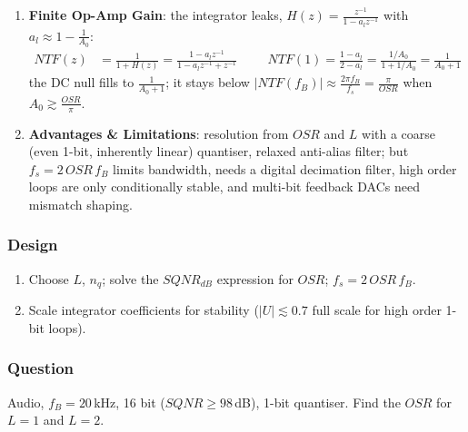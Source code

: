 \begin{enumerate}
    \paragraph{At Input:} discrete time: switched sampling capacitance at \(f_s\); continuous time:
    the first integrator input resistance (Section~\ref{sec:amp_integrator}).
  \item \textbf{Finite Op-Amp Gain}: the integrator leaks, \(H(z) = \frac{z^{-1}}{1 - a_l z^{-1}}\) with \(a_l \approx 1 - \frac{1}{A_0}\):
    \begin{align*}
      NTF(z) &= \frac{1}{1 + H(z)} = \frac{1 - a_l z^{-1}}{1 - a_l z^{-1} + z^{-1}} \hspace{1cm}
      NTF(1) = \frac{1 - a_l}{2 - a_l} = \frac{1/A_0}{1 + 1/A_0} = \frac{1}{A_0 + 1}
    \end{align*}
    the DC null fills to \(\frac{1}{A_0 + 1}\); it stays below \(|NTF(f_B)| \approx \frac{2\pi f_B}{f_s} = \frac{\pi}{OSR}\) when \(A_0 \gtrsim \frac{OSR}{\pi}\).
  \item \textbf{Advantages \& Limitations}: resolution from \(OSR\) and \(L\) with a coarse (even 1-bit,
    inherently linear) quantiser, relaxed anti-alias filter; but \(f_s = 2\,OSR\,f_B\) limits bandwidth,
    needs a digital decimation filter, high order loops are only conditionally stable, and
    multi-bit feedback DACs need mismatch shaping.
\end{enumerate}

\subsubsection{Design}
\begin{enumerate}
  \item Choose \(L\), \(n_q\); solve the \(SQNR_{dB}\) expression for \(OSR\); \(f_s = 2\,OSR\,f_B\).
  \item Scale integrator coefficients for stability (\(|U| \lesssim 0.7\) full scale for high order 1-bit loops).
\end{enumerate}

\subsubsection{Question}
Audio, \(f_B = 20\,\)kHz, 16 bit (\(SQNR \geq 98\,\)dB), 1-bit quantiser. Find the
\(OSR\) for \(L = 1\) and \(L = 2\).
